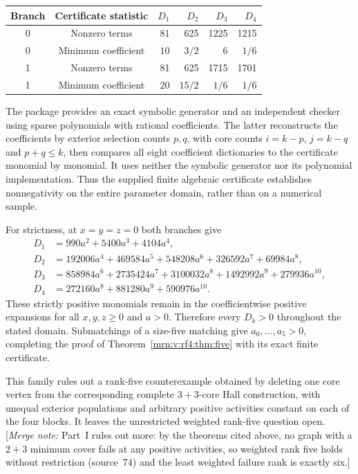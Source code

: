 \documentclass[11pt,a4paper]{article}
\theoremstyle{remark}\newtheorem{remark}[theorem]{Remark}
\newcommand{\mnote}[1]{[\textit{Merge note:} #1]}
\begin{document}
\begin{center}
\begin{tabular}{@{}ccrrrr@{}}
\toprule
Branch & Certificate statistic & $D_1$ & $D_2$ & $D_3$ & $D_4$\\
\midrule
0 & Nonzero terms & 81 & 625 & 1225 & 1215\\
0 & Minimum coefficient & $10$ & $3/2$ & $6$ & $1/6$\\
1 & Nonzero terms & 81 & 625 & 1715 & 1701\\
1 & Minimum coefficient & $20$ & $15/2$ & $1/6$ & $1/6$\\
\bottomrule
\end{tabular}
\end{center}
The package provides an exact symbolic generator and an independent checker using sparse polynomials with rational coefficients. The latter reconstructs the coefficients by exterior selection counts $p,q$, with core counts $i=k-p$, $j=k-q$ and $p+q\le k$, then compares all eight coefficient dictionaries to the certificate monomial by monomial. It uses neither the symbolic generator nor its polynomial implementation. Thus the supplied finite algebraic certificate establishes nonnegativity on the entire parameter domain, rather than on a numerical sample.

For strictness, at $x=y=z=0$ both branches give
\begin{align*}
D_1&=990a^2+5400a^3+4104a^4,\\
D_2&=192006a^4+469584a^5+548208a^6+326592a^7+69984a^8,\\
D_3&=858984a^6+2735424a^7+3100032a^8+1492992a^9+279936a^{10},\\
D_4&=272160a^8+881280a^9+590976a^{10}.
\end{align*}
These strictly positive monomials remain in the coefficientwise positive expansions for all $x,y,z\ge0$ and $a>0$. Therefore every $D_k>0$ throughout the stated domain. Submatchings of a size-five matching give $a_0,\ldots,a_5>0$, completing the proof of Theorem~\ref{mrn:v:rf4:thm:five} with its exact finite certificate.

This family rules out a rank-five counterexample obtained by deleting one core vertex from the corresponding complete $3+3$-core Hall construction, with unequal exterior populations and arbitrary positive activities constant on each of the four blocks. It leaves the unrestricted weighted rank-five question open.
\mnote{Part~I rules out more: by the theorems cited above, no graph with a
$2+3$ minimum cover fails at any positive activities, so weighted rank five
holds without restriction (source~74) and the least weighted failure rank is
exactly six.}
\end{document}
